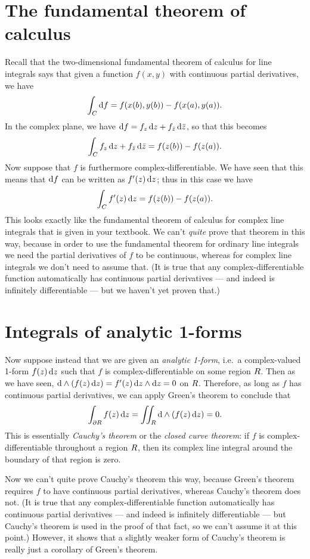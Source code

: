\section{The fundamental theorem of calculus}
\label{sec:complex-ftc}

Recall that the two-dimensional fundamental theorem of calculus for line integrals says that given a function $f(x,y)$ with continuous partial derivatives, we have
\[ \int_{C} {\mathrm{d} f} = f(x(b),y(b)) - f(x(a),y(a)). \]
In the complex plane, we have ${\mathrm{d} f} = {f}_{z} \,{\mathrm{d} z} + {f}_{\bar{z}} \,{\mathrm{d} \bar{z}}$, so that this becomes
\[ \int_{C} {f}_{z} \,{\mathrm{d} z} + {f}_{\bar{z}} \,{\mathrm{d} \bar{z}}  = f(z(b)) - f(z(a)). \]
Now suppose that $f$ is furthermore complex-differentiable.
We have seen that this means that ${\mathrm{d} f}$ can be written as $f'(z) \,{\mathrm{d} z}$; thus in this case we have
\[ \int_{C} f'(z)\,{\mathrm{d} z}  = f(z(b)) - f(z(a)). \]
This looks exactly like the fundamental theorem of calculus for complex line integrals that is given in your textbook.
We can't \emph{quite} prove that theorem in this way, because in order to use the fundamental theorem for ordinary line integrals we need the partial derivatives of $f$ to be continuous, whereas for complex line integrals we don't need to assume that.
(It is true that any complex-differentiable function automatically has continuous partial derivatives --- and indeed is infinitely differentiable --- but we haven't yet proven that.)

\section{Integrals of analytic 1-forms}
\label{sec:integrals-of-analytic-1forms}

Now suppose instead that we are given an \emph{analytic 1-form}, i.e.\ a complex-valued 1-form $f(z) \,{\mathrm{d} z}$ such that $f$ is complex-differentiable on some region $R$.
Then as we have seen, $\mathrm{d}\wedge(f(z)\,{\mathrm{d} z}) = f'(z)\,{\mathrm{d} z} \wedge{\ensuremath{\mathrm{d} z}} = 0$ on $R$.
Therefore, as long as $f$ has continuous partial derivatives, we can apply Green's theorem to conclude that
\[ \int_{\partial R} f(z)\,{\mathrm{d} z} = \iint_{R} \mathrm{d}\wedge(f(z)\,{\mathrm{d} z}) = 0. \]
This is essentially \emph{Cauchy's theorem} or the \emph{closed curve theorem}: if $f$ is complex-differentiable throughout a region $R$, then its complex line integral around the boundary of that region is zero.

Now we can't quite prove Cauchy's theorem this way, because Green's theorem requires $f$ to have continuous partial derivatives, whereas Cauchy's theorem does not.
(It is true that any complex-differentiable function automatically has continuous partial derivatives --- and indeed is infinitely differentiable --- but Cauchy's theorem is used in the proof of that fact, so we can't assume it at this point.)
However, it shows that a slightly weaker form of Cauchy's theorem is really just a corollary of Green's theorem.

